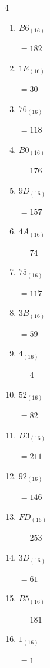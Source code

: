 \begin{multicols}{4}
\begin{enumerate}
        $=248$

  \item $B6_{(16)}$

        $=182$

  \item $1E_{(16)}$

        $=30$

  \item $76_{(16)}$

        $=118$

  \item $B0_{(16)}$

        $=176$

  \item $9D_{(16)}$

        $=157$

\columnbreak %

  \item $4A_{(16)}$

        $=74$

  \item $75_{(16)}$

        $=117$

  \item $3B_{(16)}$

        $=59$

  \item $4_{(16)}$

        $=4$

  \item $52_{(16)}$

        $=82$

  \item $D3_{(16)}$

        $=211$

  \item $92_{(16)}$

        $=146$

  \item $FD_{(16)}$

        $=253$

  \item $3D_{(16)}$

        $=61$

  \item $B5_{(16)}$

        $=181$

  \item $1_{(16)}$

        $=1$


\end{enumerate}
\end{multicols}

